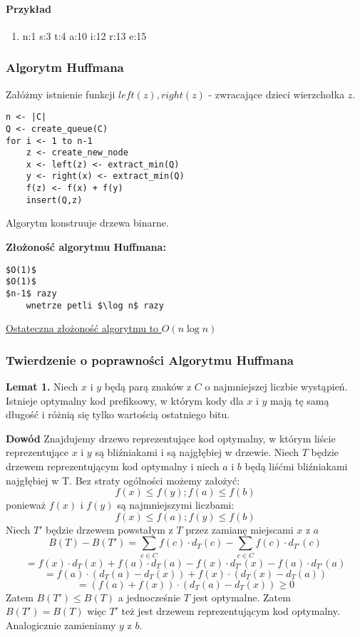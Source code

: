\paragraph{Przykład}
\begin{enumerate}
\item n:1 s:3 t:4 a:10 i:12 r:13 e:15
\end{enumerate}

\subsubsection{Algorytm Huffmana}
Załóżmy istnienie funkcji $left(z), right(z)$ - zwracające dzieci wierzchołka $z$.
\begin{lstlisting}[caption={Huffman(C,F)}]
n <- |C|
Q <- create_queue(C)
for i <- 1 to n-1
	z <- create_new_node
	x <- left(z) <- extract_min(Q)
	y <- right(x) <- extract_min(Q)
	f(z) <- f(x) + f(y)
	insert(Q,z)
\end{lstlisting}

Algorytm konstruuje drzewa binarne.

\textbf{Złożoność algorytmu Huffmana:}
\begin{lstlisting}
$O(1)$
$O(1)$
$n-1$ razy
	wnetrze petli $\log n$ razy
\end{lstlisting}
\underline{Ostateczna złożoność algorytmu to $O(n \log n)$}

\subsubsection{Twierdzenie o poprawności Algorytmu Huffmana}
\textbf{Lemat 1.} Niech $x$ i $y$ będą parą znaków z $C$ o najmniejszej liczbie wystąpień. Istnieje optymalny kod prefiksowy, w którym kody dla $x$ i $y$ mają tę samą długość i różnią się tylko wartością ostatniego bitu.

\textbf{Dowód} Znajdujemy drzewo reprezentujące kod optymalny, w którym liście reprezentujące $x$ i $y$ są bliźniakami i są najgłębiej w drzewie. Niech $T$ będzie drzewem reprezentującym kod optymalny i niech $a$ i $b$ będą liśćmi bliźniakami najgłębiej w T. 
Bez straty ogólności możemy założyć:
$$ f(x) \leq f(y); f(a) \leq f(b) $$
ponieważ $f(x)$ i $f(y)$ są najmniejszymi liczbami:
$$ f(x) \leq f(a); f(y) \leq f(b) $$
Niech $T'$ będzie drzewem powstałym z $T$ przez zamianę miejscami $x$ z $a$
$$ B(T) - B(T') = \sum_{c \in C} f(c) \cdot d_T(c) - \sum_{c \in C} f(c) \cdot d_{T'}(c) $$
$$ = f(x) \cdot d_T(x) + f(a) \cdot d_T(a) - f(x) \cdot d_{T'}(x) - f(a) \cdot d_{T'}(a) $$
$$ = f(a) \cdot (d_T(a) - d_T(x)) + f(x) \cdot (d_T(x) - d_T(a)) $$ 
$$ = (f(a) + f(x)) \cdot (d_T(a) - d_T(x)) \geq 0$$
Zatem $B(T') \leq B(T)$ a jednocześnie $T$ jest optymalne. Zatem $B(T') = B(T)$ więc $T'$ też jest drzewem reprezentującym kod optymalny. Analogicznie zamieniamy $y$ z $b$.

